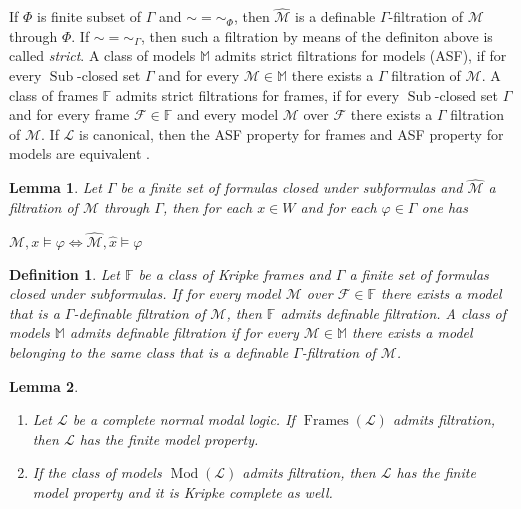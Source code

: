 \documentclass[a4paper]{article}
\theoremstyle{defin}
\newtheorem{defin}{Definition}
\theoremstyle{theorem}
\theoremstyle{prop}
\theoremstyle{lemma}
\newtheorem{lemma}{Lemma}
\theoremstyle{fact}
\theoremstyle{ex}
\theoremstyle{col}
\begin{document}
If $\Phi$ is finite subset of $\Gamma$ and $\sim = \sim_{\Phi}$, then $\widehat{\mathcal{M}}$ is a definable $\Gamma$-filtration of $\mathcal{M}$ through $\Phi$. If $\sim = \sim_{\Gamma}$, then such a filtration by means of the definiton above is called \emph{strict}. A class of models $\mathbb{M}$ admits strict filtrations for models (ASF), if for every $\operatorname{Sub}$-closed set $\Gamma$ and for every $\mathcal{M} \in \mathbb{M}$ there exists a $\Gamma$ filtration of $\mathcal{M}$.
A class of frames $\mathbb{F}$ admits strict filtrations for frames, if for every $\operatorname{Sub}$-closed set $\Gamma$ and for every frame $\mathcal{F} \in \mathbb{F}$ and every model $\mathcal{M}$ over $\mathcal{F}$ there exists a $\Gamma$ filtration of $\mathcal{M}$. If $\mathcal{L}$ is canonical, then the ASF property for frames and ASF property for models are equivalent \cite[Theorem 2.10]{kikot2020completeness}.

\begin{lemma}
  Let $\Gamma$ be a finite set of formulas closed under subformulas and $\widehat{\mathcal{M}}$ a filtration of $\mathcal{M}$ through $\Gamma$, then for each $x \in W$ and for each $\varphi \in \Gamma$ one has
  \begin{center}
    $\mathcal{M}, x \models \varphi \Leftrightarrow \widehat{\mathcal{M}}, \hat{x} \models \varphi$
  \end{center}
\end{lemma}

\begin{defin} Let $\mathbb{F}$ be a class of Kripke frames and $\Gamma$ a finite set of formulas closed under subformulas. If for every model $\mathcal{M}$ over $\mathcal{F} \in \mathbb{F}$ there exists a model that is a $\Gamma$-definable filtration of $\mathcal{M}$, then $\mathbb{F}$ admits definable filtration. A class of models $\mathbb{M}$ admits definable filtration if for every $\mathcal{M} \in \mathbb{M}$ there exists a model belonging to the same class that is a definable $\Gamma$-filtration of $\mathcal{M}$.
\end{defin}

\begin{lemma}
  $ $

\begin{enumerate}
  \item Let $\mathcal{L}$ be a complete normal modal logic. If $\operatorname{Frames}(\mathcal{L})$ admits filtration, then $\mathcal{L}$ has the finite model property.
  \item If the class of models $\operatorname{Mod}(\mathcal{L})$ admits filtration, then $\mathcal{L}$ has the finite model property and it is Kripke complete as well.
\end{enumerate}
\end{lemma}
\end{document}
